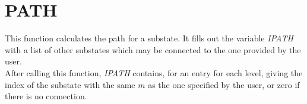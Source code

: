 \section{PATH}
\label{sect:path}

\noindent This function calculates the path for a substate. It fills out the
variable {\em IPATH} with a list of other substates which may be connected
to the one provided by the user.\\

\noindent After calling this function, {\em IPATH} contains, for an entry
for each level, giving the index of the substate with the same $m$ as the
one specified by the user, or zero if there is no connection.\\

